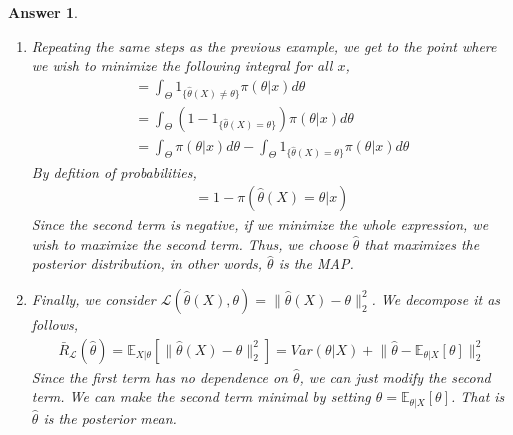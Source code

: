 \documentclass[12pt]{article}
\theoremstyle{colon}
\newtheorem*{answer}{Answer}
\begin{document}
\begin{answer}
\begin{enumerate}[label=\arabic*)]
\begin{gather*}
      \end{gather*}
      We drop the outside integral since we'll minimize the inside for each $x$.
      Remove the absolute value by breaking it into two integrals,
      \begin{gather*}
        = \int_{-\infty}^{\widehat{\theta}} (\widehat{\theta} - \theta) \pi(\theta|x) d\theta + \int_{\widehat{\theta}}^\infty (\theta - \widehat{\theta}) \pi(\theta|x) d\theta
      \end{gather*}
      Differentiate w.r.t. $\widehat{\theta}$ and set to 0,
      \begin{gather*}
        \implies \int_{-\infty}^{\widehat{\theta}} \pi(\theta|x) d\theta = \int_{\widehat{\theta}}^\infty \pi(\theta|x) d\theta
      \end{gather*}
      That is, $\widehat{\theta}$ is the median for the posterior distribution.
    \item Repeating the same steps as the previous example, we get to the point where we wish to minimize the following integral for all $x$,
      \begin{gather*}
        = \int_\Theta 1_{\{ \widehat{\theta}(X) \neq \theta \}} \pi(\theta|x) d\theta \\
        = \int_\Theta (1-1_{\{ \widehat{\theta}(X) = \theta \}}) \pi(\theta|x) d\theta \\
        = \int_\Theta \pi(\theta|x) d\theta - \int_\Theta 1_{\{ \widehat{\theta}(X) = \theta \}} \pi(\theta|x) d\theta
      \end{gather*}
      By defition of probabilities,
      \begin{gather*}
        = 1 - \pi(\widehat{\theta}(X) = \theta | x)
      \end{gather*}
      Since the second term is negative, if we minimize the whole expression, we wish to maximize the second term. Thus, we choose $\widehat{\theta}$ that maximizes the posterior distribution, in other words, $\widehat{\theta}$ is the MAP.
    \item Finally, we consider $\mathcal{L}(\widehat{\theta}(X), \theta) = \lVert \widehat{\theta}(X) - \theta \rVert_2^2$. We decompose it as follows,
      \begin{gather*}
        \bar{R}_\mathcal{L}(\widehat{\theta}) = \mathbb{E}_{X|\theta}[\lVert \widehat{\theta}(X) - \theta \rVert_2^2] = Var(\theta | X) + \lVert \widehat{\theta} - \mathbb{E}_{\theta|X}[\theta] \rVert_2^2
      \end{gather*}
      Since the first term has no dependence on $\widehat{\theta}$, we can just modify the second term. We can make the second term minimal by setting $\widehat{\theta} = \mathbb{E}_{\theta|X}[\theta]$. That is $\widehat{\theta}$ is the posterior mean.
  \end{enumerate}
\end{answer}
\end{document}
